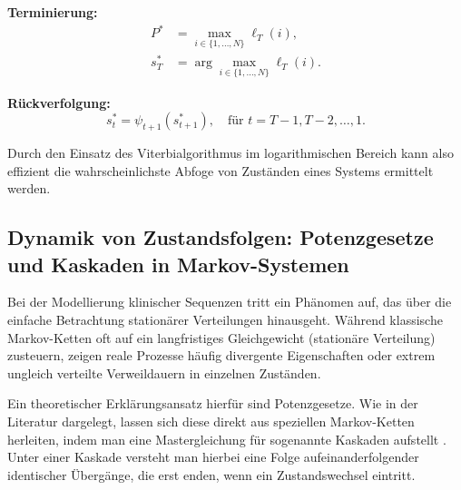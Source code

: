 \textbf{Terminierung:}
\begin{equation}
\begin{aligned}
  P^*   &= \max_{i \in \{1, \ldots, N\}} \ell_T(i), \\
  s_T^* &= \arg\max_{i \in \{1, \ldots, N\}} \ell_T(i).
\end{aligned}
\end{equation}

\textbf{Rückverfolgung:}
\begin{equation}
  s_t^* = \psi_{t+1}(s_{t+1}^*), \quad \text{für } t = T-1, T-2, \ldots, 1.
\end{equation}

Durch den Einsatz des Viterbialgorithmus im logarithmischen Bereich kann also effizient die wahrscheinlichste Abfoge von Zuständen eines Systems ermittelt werden.


\subsection{Dynamik von Zustandsfolgen: Potenzgesetze und Kaskaden in Markov-Systemen} 

Bei der Modellierung klinischer Sequenzen tritt ein Phänomen auf, das über die einfache Betrachtung stationärer Verteilungen hinausgeht. Während klassische Markov-Ketten oft auf ein langfristiges Gleichgewicht (stationäre Verteilung) zusteuern, zeigen reale Prozesse häufig divergente Eigenschaften oder extrem ungleich verteilte Verweildauern in einzelnen Zuständen.

Ein theoretischer Erklärungsansatz hierfür sind Potenzgesetze. Wie in der Literatur dargelegt, lassen sich diese direkt aus speziellen Markov-Ketten herleiten, indem man eine Mastergleichung für sogenannte Kaskaden aufstellt \cite{10.1098/rsos.220531}. Unter einer Kaskade versteht man hierbei eine Folge aufeinanderfolgender identischer Übergänge, die erst enden, wenn ein Zustandswechsel eintritt.


